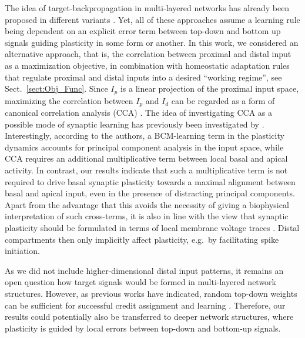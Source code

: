 \documentclass[utf8]{frontiersSCNS} %
\begin{document}
The idea of target-backpropagation in multi-layered networks
has already been proposed in different variants
\citep{Bengio2014,Lee2015,Guerguiev2017}. Yet, all of these approaches
assume a learning rule being dependent on an explicit error term 
between top-down and bottom up signals guiding plasticity in some form
or another. In this work, we considered an alternative approach, that is,
the correlation between proximal and distal input as a maximization
objective, in combination with homeostatic adaptation rules that regulate
proximal and distal inputs into a desired ``working regime'', 
see Sect.~\ref{sect:Obj_Func}. 
Since $I_p$ is a linear projection of the 
proximal input space, maximizing the correlation between
$I_p$ and $I_d$ can be regarded as a form of canonical correlation
analysis (CCA) \citep{Haerdle2007}. The idea of investigating CCA as a
possible mode of synaptic learning has previously been investigated by
\citet{Haga2018}. Interestingly, according to the authors, a 
BCM-learning term in the plasticity dynamics accounts for principal component
analysis in the input space, while CCA requires an additional multiplicative
term between local basal and apical activity. In contrast, our results
indicate that such a multiplicative term is not required to drive basal
synaptic plasticity towards a maximal alignment between basal and apical
input, even in the presence of distracting principal components.
Apart from the advantage that this avoids the necessity of giving
a biophysical interpretation of such cross-terms, it is also in line
with the view that synaptic plasticity should be formulated
in terms of local membrane voltage traces \citep{Clopath2010,Weissenberger2018}. 
Distal compartments then only implicitly affect plasticity, 
e.g.\ by facilitating spike initiation.

As we did not include higher-dimensional distal input patterns, it
remains an open question how target signals would be formed in
multi-layered network structures. However, as previous works have
indicated, random top-down weights can be sufficient for
successful credit assignment and learning \citep{Lillicrap2016,Guerguiev2017}.
Therefore, our results could potentially also be transferred to deeper
network structures, where plasticity is guided by local errors between
top-down and bottom-up signals.

\end{document}
